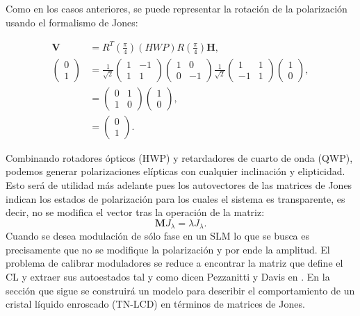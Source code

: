 Como en los casos anteriores, se puede representar la rotación de la
polarización usando el formalismo de Jones:

\begin{align*}
\mathbf{V} &=
R^{T}\left(\frac{\pi}{4}\right)\left(HWP\right)R\left(\frac{\pi}{4}\right)\mathbf{H},\\ 
\begin{pmatrix}
0\\1
\end{pmatrix}&=
 \frac{1}{\sqrt{2}}
\begin{pmatrix}
  1 &-1\\1&1
\end{pmatrix}
\begin{pmatrix} 1
  &0\\0&-1 \end{pmatrix}
 \frac{1}{\sqrt{2}}
\begin{pmatrix}
1&1\\-1&1
\end{pmatrix}
\begin{pmatrix}
1\\ 0
\end{pmatrix},
\\
&=
\begin{pmatrix}
0  & 1 \\1 & 0
\end{pmatrix}
\begin{pmatrix}
1\\ 0
\end{pmatrix},\\&=
\begin{pmatrix}
0\\1
\end{pmatrix}.
\end{align*}


Combinando rotadores ópticos (HWP) y retardadores de cuarto de onda (QWP),
podemos generar polarizaciones elípticas con cualquier inclinación y
elipticidad. Esto será de utilidad más adelante pues los autovectores
de las matrices de Jones indican los estados de polarización para los
cuales el sistema es transparente, es decir, no se modifica el vector
tras la operación de la matriz:
\[\mathbf{M}J_{\lambda} = \lambda J_{\lambda}.\]
Cuando se desea modulación de sólo fase en un SLM lo que se busca es
precisamente que no se modifique la polarización y por ende la
amplitud. El problema de calibrar moduladores se reduce a encontrar la
matriz que define el CL y extraer sus autoestados tal y como dicen
Pezzanitti y Davis en .
En la sección que sigue se construirá un modelo para describir el
comportamiento de un cristal líquido enroscado (TN-LCD) en términos de
matrices de Jones.

